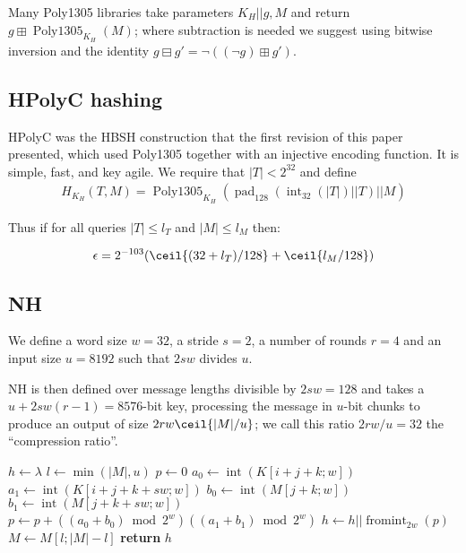 \documentclass[journal=tosc,preprint,floatrow,submission]{iacrtrans}
\DeclareMathOperator{\Polydjb}{Poly1305}
\DeclareMathOperator{\intify}{int}
\DeclareMathOperator{\fromint}{fromint}
\DeclareMathOperator{\pad}{pad}
\begin{document}
Many Poly1305 libraries
take parameters $K_H || g, M$ and return $g \boxplus \Polydjb_{K_H}(M)$; where subtraction
is needed we suggest using bitwise inversion and the identity
$g \boxminus g' = \neg ((\neg g) \boxplus g')$.

\subsection{HPolyC hashing}
HPolyC was the HBSH construction that the first revision of this paper presented, which used
Poly1305 together with an injective encoding function.
It is simple, fast, and key agile. We require that $|T| < 2^{32}$ and define
\begin{align*}
H_{K_H}(T, M) = \Polydjb_{K_H}(\pad_{128}(\intify_{32}(|T|) || T) || M)
\end{align*}

Thus if for all queries $|T| \leq l_T$ and $|M| \leq l_M$ then:

\begin{displaymath}
\epsilon = 2^{-103}(\ceil{(32 + l_T)/128} + \ceil{l_M/128})
\end{displaymath}

\subsection{NH}\label{nh}

We define a word size $w = 32$, a stride $s = 2$,
a number of rounds $r = 4$ and an input size $u = 8192$ such that $2sw$ divides $u$.

NH\cite{umac1,umac2,rfc4418} is then defined over message
lengths divisible by $2sw = 128$
and takes a $u + 2sw(r -1) = 8576$-bit key, processing the message
in $u$-bit chunks to produce
an output of size $2rw\ceil{|M|/u}$; we call this ratio $2rw/u = 32$ the ``compression ratio''.

\begin{algorithmic}[0]
    \State $h \gets \lambda$
        \State $l \gets \min{(|M|, u)}$
            \State $p \gets 0$
                    \State $a_0 \gets \intify(K[i+j+k;w])$
                    \State $a_1 \gets \intify(K[i+j+k+sw;w])$
                    \State $b_0 \gets \intify(M[j+k;w])$
                    \State $b_1 \gets \intify(M[j+k+sw;w])$
                    \State $p \gets p + ((a_0 + b_0) \bmod 2^w)((a_1 + b_1) \bmod 2^w)$
                \EndFor
            \EndFor
            \State $h \gets h || \fromint_{2w}(p)$
        \EndFor
        \State $M \gets M[l;|M| - l]$
    \EndWhile
    \State \textbf{return} $h$
    \EndProcedure
\end{algorithmic}
\end{document}
